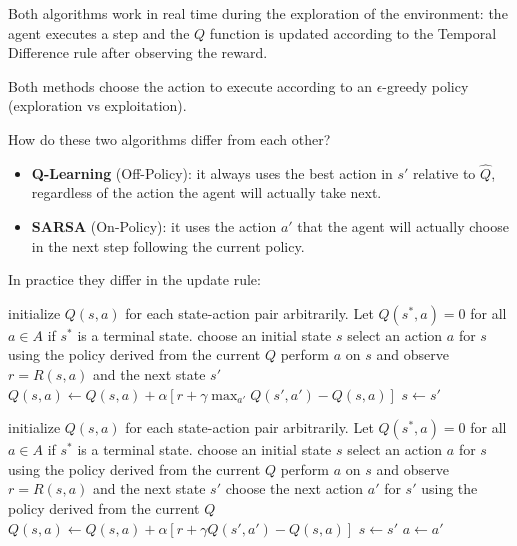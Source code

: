 \documentclass[10pt, a4paper]{report}
\begin{document}
Both algorithms work in real time during the exploration of the environment: the agent executes a step and the $Q$ function is updated according to the Temporal Difference rule after observing the reward.
\begin{boxobservation}{}{}
    Both methods choose the action to execute according to an $\epsilon$-greedy policy (exploration vs exploitation).
\end{boxobservation}
\noindent How do these two algorithms differ from each other?
\begin{itemize}
    \item \textbf{Q-Learning} (Off-Policy): it always uses the best action in $s'$ relative to $\hat Q$, regardless of the action the agent will actually take next.
    \item \textbf{SARSA} (On-Policy): it uses the action $a'$ that the agent will actually choose in the next step following the current policy.
\end{itemize}
\noindent In practice they differ in the update rule:
\begin{algorithm}[H]
\caption{Q-Learning}\label{alg:Q-Learning}
\begin{algorithmic}[1]
    \State initialize $Q(s,a)$ for each state-action pair arbitrarily. Let $Q(s^*,a)=0$ for all $a\in A$ if $s^*$ is a terminal state.
    \State choose an initial state $s$
    \State select an action $a$ for $s$ using the policy derived from the current $Q$ \quad{}
    \State perform $a$ on $s$ and observe $r=R(s,a)$ and the next state $s'$
    \State $Q(s,a)\leftarrow Q(s,a)+\alpha\left[r+\gamma\max_{a'} Q(s',a')-Q(s,a)\right]$
    \State $s\leftarrow s'$
    \EndWhile
    \EndFor
\end{algorithmic}
\end{algorithm}
\begin{algorithm}[H]
\caption{SARSA}\label{alg:SARSA}
\begin{algorithmic}[1]
    \State initialize $Q(s,a)$ for each state-action pair arbitrarily. Let $Q(s^*,a)=0$ for all $a\in A$ if $s^*$ is a terminal state.
    \State choose an initial state $s$
    \State select an action $a$ for $s$ using the policy derived from the current $Q$ \quad{}
    \State perform $a$ on $s$ and observe $r=R(s,a)$ and the next state $s'$
    \State choose the next action $a'$ for $s'$ using the policy derived from the current $Q$ \quad{}
    \State $Q(s,a)\leftarrow Q(s,a)+\alpha\left[r+\gamma Q(s',a')-Q(s,a)\right]$
    \State $s\leftarrow s'$
    \State $a\leftarrow a'$
    \EndWhile
    \EndFor
\end{algorithmic}
\end{algorithm}
\end{document}
